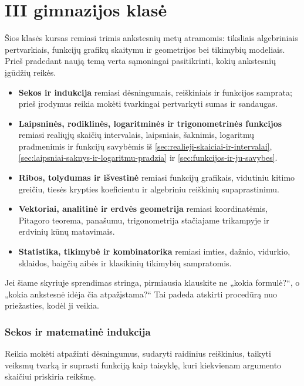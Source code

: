 \part{III gimnazijos klasė}
\begin{tcolorbox}[title=III gimnazijos kurso žemėlapis, colback=blue!5]
Šios klasės kursas remiasi trimis ankstesnių metų atramomis: tiksliais algebriniais pertvarkiais, funkcijų grafikų skaitymu ir geometrijos bei tikimybių modeliais. Prieš pradedant naują temą verta sąmoningai pasitikrinti, kokių ankstesnių įgūdžių reikės.

\begin{itemize}
\item \textbf{Sekos ir indukcija} remiasi dėsningumais, reiškiniais ir funkcijos samprata; prieš įrodymus reikia mokėti tvarkingai pertvarkyti sumas ir sandaugas.
\item \textbf{Laipsninės, rodiklinės, logaritminės ir trigonometrinės funkcijos} remiasi realiųjų skaičių intervalais, laipsniais, šaknimis, logaritmų pradmenimis ir funkcijų savybėmis iš \ref{sec:realieji-skaiciai-ir-intervalai}, \ref{sec:laipsniai-saknys-ir-logaritmu-pradzia} ir \ref{sec:funkcijos-ir-ju-savybes}.
\item \textbf{Ribos, tolydumas ir išvestinė} remiasi funkcijų grafikais, vidutiniu kitimo greičiu, tiesės krypties koeficientu ir algebriniu reiškinių supaprastinimu.
\item \textbf{Vektoriai, analitinė ir erdvės geometrija} remiasi koordinatėmis, Pitagoro teorema, panašumu, trigonometrija stačiajame trikampyje ir erdvinių kūnų matavimais.
\item \textbf{Statistika, tikimybė ir kombinatorika} remiasi imties, dažnio, vidurkio, sklaidos, baigčių aibės ir klasikinių tikimybių sampratomis.
\end{itemize}

Jei šiame skyriuje sprendimas stringa, pirmiausia klauskite ne „kokia formulė?“, o „kokia ankstesnė idėja čia atpažįstama?“ Tai padeda atskirti procedūrą nuo priežasties, kodėl ji veikia.
\end{tcolorbox}

\section{Sekos ir matematinė indukcija}\label{sec:sekos-ir-matematine-indukcija}

\begin{tcolorbox}[title=Prieš pradedant, colback=green!5]
Reikia mokėti atpažinti dėsningumus, sudaryti raidinius reiškinius, taikyti veiksmų tvarką ir suprasti funkciją kaip taisyklę, kuri kiekvienam argumento skaičiui priskiria reikšmę.
\end{tcolorbox}
